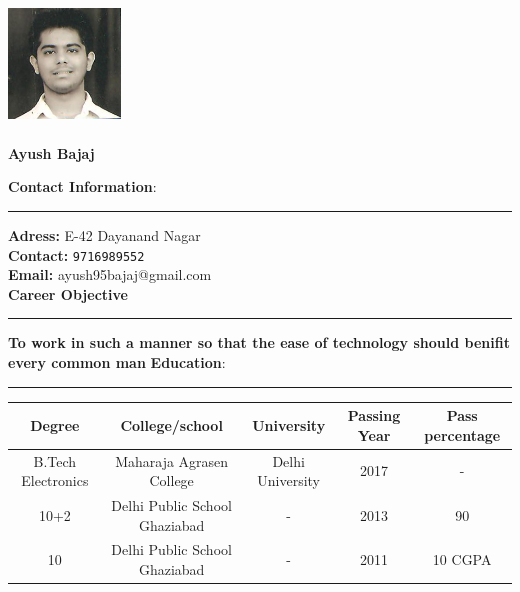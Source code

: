 \documentclass[a4paper,10pt]{article}
\begin{document}
\begin{flushright}
\includegraphics[width=3cm, height=4cm]{001.jpg}\\
\large
\textbf{\bigskip Ayush Bajaj}
\end{flushright}


\begin{flushleft}
	\textbf{\large Contact Information}:\\
	\hrule
	\bigskip
	\textbf{Adress:}            E-42 Dayanand Nagar\\
	\textbf{Contact:}   \texttt{9716989552}\\
	\textbf{Email:}             ayush95bajaj@gmail.com\\
	\bigskip
	\textbf{\large Career Objective} 
	\hrule
	\bigskip
	\textbf{To work in such a manner so that the ease of technology should benifit every common man}
	\textbf{\large  Education}:\\
	\hrule
	\bigskip
	\begin{tabular}{|c|c|c|c|c|}
   		\hline \textbf{ Degree}  & \textbf{College/school}  & \textbf{University} & \textbf{Passing Year} 			& 		\textbf{ Pass percentage} \\ 
   		\hline B.Tech Electronics & Maharaja Agrasen College  & Delhi University & 2017 & - \\ 
   		\hline 
			10+2 & Delhi Public School Ghaziabad & - & 2013 & 90 \\
    	\hline
\hline 
			10 & Delhi Public School Ghaziabad & - & 2011 & 10 CGPA \\
    	\hline
	\end{tabular} 
	\end{flushleft}
	
\end{document}
